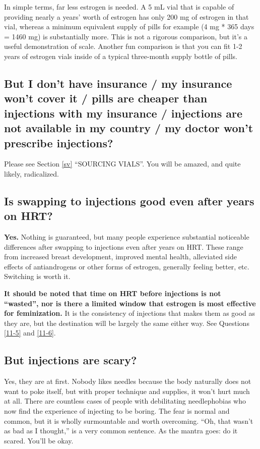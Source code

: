 \documentclass{article}
\begin{document}
In simple terms, far less estrogen is needed. A 5 mL vial that is capable of providing nearly a years’ worth of estrogen has only 200 mg of estrogen in that vial, whereas a minimum equivalent supply of pills for example (4 mg * 365 days = 1460 mg) is substantially more. This is not a rigorous comparison, but it’s a useful demonstration of scale. Another fun comparison is that you can fit 1-2 years of estrogen vials inside of a typical three-month supply bottle of pills.

\subsection{But I don’t have insurance / my insurance won’t cover it / pills are cheaper than injections with my insurance / injections are not available in my country / my doctor won’t prescribe injections?}

Please see Section \ref{sv} “SOURCING VIALS”. You will be amazed, and quite likely, radicalized.

\subsection{Is swapping to injections good even after years on HRT?}

\textbf{Yes.} Nothing is guaranteed, but many people experience substantial noticeable differences after swapping to injections even after years on HRT. These range from increased breast development, improved mental health, alleviated side effects of antiandrogens or other forms of estrogen, generally feeling better, etc. Switching is worth it.

\textbf{It should be noted that time on HRT before injections is not “wasted”, nor is there a limited window that estrogen is most effective for feminization.} It is the consistency of injections that makes them as good as they are, but the destination will be largely the same either way. See Questions \ref{11-5} and \ref{11-6}.

\subsection{But injections are scary?}

Yes, they are at first. Nobody likes needles because the body naturally does not want to poke itself, but with proper technique and supplies, it won’t hurt much at all. There are countless cases of people with debilitating needlephobias who now find the experience of injecting to be boring. The fear is normal and common, but it is wholly surmountable and worth overcoming. “Oh, that wasn’t as bad as I thought,” is a very common sentence. As the mantra goes: do it scared. You’ll be okay.
\end{document}
